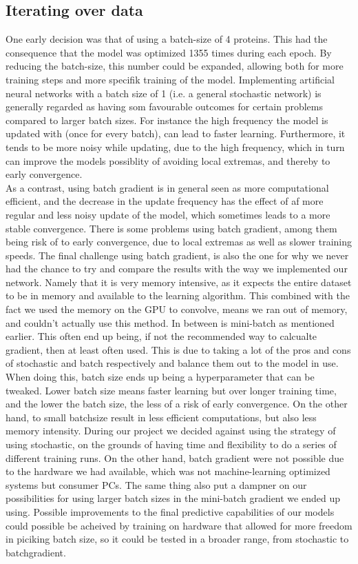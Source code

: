 \subsection{Iterating over data}
One early decision was that of using a batch-size of 4 proteins. This had the consequence that the model was optimized 1355 times during each epoch. By reducing the batch-size, this number could be expanded, allowing both for more training steps and more specifik training of the model. Implementing artificial neural networks with a batch size of 1 (i.e. a general stochastic network) is generally regarded as having som favourable outcomes for certain problems compared to larger batch sizes. For instance the high frequency the model is updated with (once for every batch), can lead to faster learning. Furthermore, it tends to be more noisy while updating, due to the high frequency, which in turn can improve the models possiblity of avoiding local extremas, and thereby to early convergence.\\
As a contrast, using batch gradient is in general seen as more computational efficient, and the decrease in the update frequency has the effect of af more regular and less noisy update of the model, which sometimes leads to a more stable convergence. There is some problems using batch gradient, among them being risk of to early convergence, due to local extremas as well as slower training speeds. The final challenge using batch gradient, is also the one for why we never had the chance to try and compare the results with the way we implemented our network. Namely that it is very memory intensive, as it expects the entire dataset to be in memory and available to the learning algorithm. This combined with the fact we used the memory on the GPU to convolve, means we ran out of memory, and couldn't actually use this method. In between is mini-batch as mentioned earlier. This often end up being, if not the recommended way to calcualte gradient, then at least often used. This is due to taking a lot of the pros and cons of stochastic and batch respectively and balance them out to the model in use. When doing this, batch size ends up being a hyperparameter that can be tweaked. Lower batch size means faster learning but over longer training time, and the lower the batch size, the less of a risk of early convergence. On the other hand, to small batchsize result in less efficient computations, but also less memory intensity. During our project we decided against using the strategy of using stochastic, on the grounds of having time and flexibility to do a series of different training runs. On the other hand, batch gradient were not possible due to the hardware we had available, which was not machine-learning optimized systems but consumer PCs. The same thing also put a dampner on our possibilities for using larger batch sizes in the mini-batch gradient we ended up using. Possible improvements to the final predictive capabilities of our models could possible be acheived by training on hardware that allowed for more freedom in piciking batch size, so it could be tested in a broader range, from stochastic to batchgradient.\\

